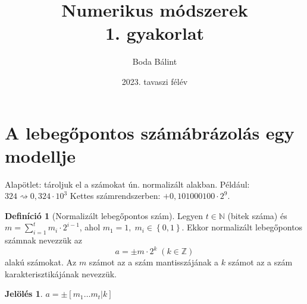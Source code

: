 \documentclass[a4paper,12pt]{article}
\title{\huge{Numerikus módszerek} \\[-4pt] \large 1. gyakorlat \vspace{-15pt}}
\author{Boda Bálint}
\date{\vspace{-12pt}2023. tavaszi félév}
\theoremstyle{definition}
\newtheorem*{definition*}{Definíció}
\newtheorem*{notation*}{Jelölés}
\begin{document}
	\maketitle
	\vspace{-10pt}
	\section{A lebegőpontos számábrázolás egy modellje}
		Alapötlet: tároljuk el a számokat ún. normalizált alakban. Például: $ 324 \rightsquigarrow 0,324 \cdot 10^3 $ Kettes számrendszerben: $ +0,101000100 \cdot 2^9 $.
	\begin{definition*}[Normalizált lebegőpontos szám]
		Legyen $ t \in \mathbb{N} $ (bitek száma) és $ m = \sum\limits_{i=1}^{t}{m_i \cdot 2^{i-1}} $, ahol $ m_1 = 1, \; m_i \in \left\lbrace 0, 1 \right\rbrace $. Ekkor normalizált lebegőpontos számnak nevezzük az
		\[
		a = \pm m \cdot 2^k \; (k \in \mathbb{Z})
		\]
		alakú számokat. Az $m$ számot az a szám mantisszájának a $k$ számot az a szám karakterisztikájának nevezzük.
	\end{definition*}

	\begin{notation*}
		$ a = \pm \left[ m_1 \dots m_t | k \right] $
	\end{notation*}
\end{document}
